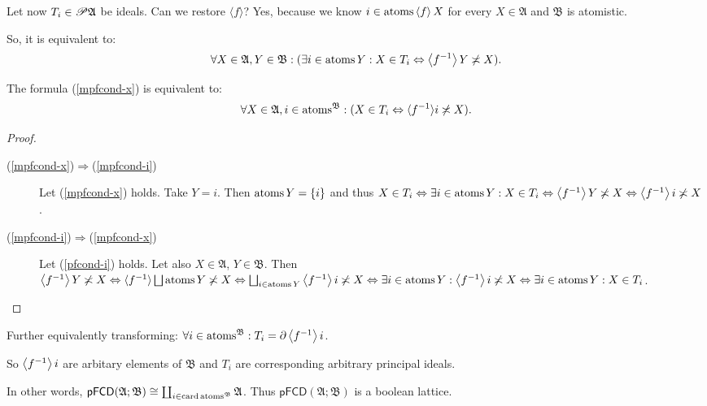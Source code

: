 Let now $T_i \in \mathscr{P} \mathfrak{A}$ be ideals. Can we restore $\langle
f \rangle$? Yes, because we know $i \in \operatorname{atoms} \left\langle f\right\rangle X$ for
every $X \in \mathfrak{A}$ and $\mathfrak{B}$ is atomistic.

So, it is equivalent to:
\begin{equation}
  \label{mpfcond-x} \forall X \in \mathfrak{A}, Y \in \mathfrak{B}: (\exists i
  \in \operatorname{atoms} Y : X \in T_i \Leftrightarrow \left\langle f^{- 1}\right\rangle Y
  \not\asymp X) .
\end{equation}
\begin{lem}
  The formula (\ref{mpfcond-x}) is equivalent to:
  \begin{equation}
    \label{mpfcond-i} \forall X \in \mathfrak{A}, i \in
    \operatorname{atoms}^{\mathfrak{B}} : (X \in T_i \Leftrightarrow \langle f^{- 1}
    \rangle i \not\asymp X) .
  \end{equation}
\end{lem}

\begin{proof}
  
  \begin{description}
    \item[(\ref{mpfcond-x})$\Rightarrow$(\ref{mpfcond-i})] Let
    (\ref{mpfcond-x}) holds. Take $Y = i$. Then $\operatorname{atoms} Y = \{ i \}$ and
    thus $X \in T_i \Leftrightarrow \exists i \in \operatorname{atoms} Y : X \in T_i
    \Leftrightarrow \left\langle f^{- 1}\right\rangle Y \not\asymp X \Leftrightarrow
    \left\langle f^{- 1}\right\rangle i \not\asymp X$.
    
    \item[(\ref{mpfcond-i})$\Rightarrow$(\ref{mpfcond-x})] Let
    (\ref{pfcond-i}) holds. Let also $X \in \mathfrak{A}$, $Y \in \mathfrak{B}$.
    Then $\left\langle f^{- 1}\right\rangle Y \not\asymp X \Leftrightarrow \langle f^{- 1}
    \rangle \bigsqcup \operatorname{atoms} Y \not\asymp X \Leftrightarrow \bigsqcup_{i
    \in \operatorname{atoms} Y} \left\langle f^{- 1}\right\rangle i \not\asymp X \Leftrightarrow
    \exists i \in \operatorname{atoms} Y : \left\langle f^{- 1}\right\rangle i \not\asymp X
    \Leftrightarrow \exists i \in \operatorname{atoms} Y : X \in T_i$.
  \end{description}
\end{proof}

Further equivalently transforming: $\forall i \in \operatorname{atoms}^{\mathfrak{B}}
: T_i = \partial \left\langle f^{- 1}\right\rangle i$.

So $\left\langle f^{- 1}\right\rangle i$ are arbitary elements of $\mathfrak{B}$ and
$T_i$ are corresponding arbitrary principal ideals.

In other words, $\mathsf{pFCD} (\mathfrak{A}; \mathfrak{B}) \cong \coprod_{i \in
\operatorname{card} \operatorname{atoms}^{\mathfrak{B}}} \mathfrak{A}$. Thus $\mathsf{pFCD}
(\mathfrak{A}; \mathfrak{B})$ is a boolean lattice.

